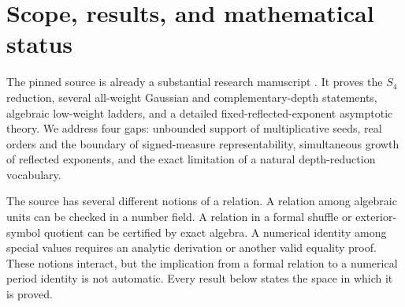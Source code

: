 \documentclass[11pt,letterpaper]{article}
\theoremstyle{definition}
\theoremstyle{remark}
\numberwithin{equation}{section}
\begin{document}
\section{Scope, results, and mathematical status}
\label{intro:sec}
The pinned source is already a substantial research manuscript
\cite{ProveIt}. It proves the \(S_4\) reduction, several all-weight
Gaussian and complementary-depth statements, algebraic low-weight
ladders, and a detailed fixed-reflected-exponent asymptotic theory.
We address four gaps: unbounded support
of multiplicative seeds, real orders and the boundary of signed-measure
representability, simultaneous growth of reflected exponents, and the
exact limitation of a natural depth-reduction vocabulary.

The source has several different notions of a relation. A relation
among algebraic units can be checked in a number field. A relation in
a formal shuffle or exterior-symbol quotient can be certified by
exact algebra. A numerical identity among special values requires an
analytic derivation or another valid equality proof. These notions
interact, but the implication from a formal relation to a numerical
period identity is not automatic. Every result below states the
space in which it is proved.
\end{document}
